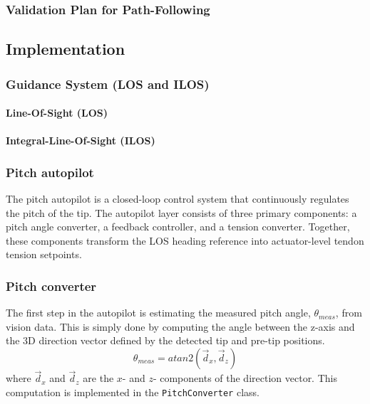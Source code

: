 \subsubsection{Validation Plan for Path-Following}


\subsection{Implementation}

\subsubsection{Guidance System (LOS and ILOS)}
\paragraph*{Line-Of-Sight (LOS)}

\paragraph*{Integral-Line-Of-Sight (ILOS)}


\subsubsection{Pitch autopilot}
The pitch autopilot is a closed-loop control system that continuously regulates the pitch of the tip. The autopilot layer consists of three primary components: a pitch angle converter, a feedback controller, and a tension converter. Together, these components transform the LOS heading reference into actuator-level tendon tension setpoints.

\subsubsection{Pitch converter}
The first step in the autopilot is estimating the measured pitch angle, \(\theta_{meas}\), from vision data. This is simply done by computing the angle between the z-axis and the 3D direction vector defined by the detected tip and pre-tip positions. 
\begin{equation}
    \theta_{meas} = atan2(\vec{d}_x,\vec{d}_z)
\end{equation}
where \(\vec{d}_x\) and \(\vec{d}_z\) are the \(x\)- and \(z\)- components of the direction vector. This computation is implemented in the \texttt{PitchConverter} class.


